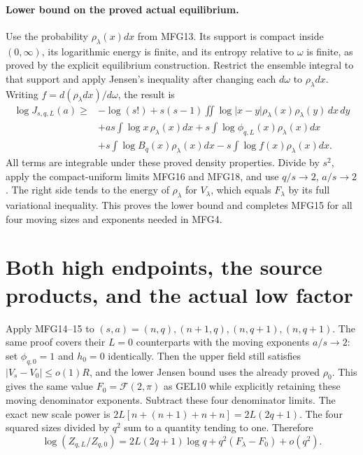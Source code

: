 \documentclass[11pt,a4paper]{article}
\begin{document}
\paragraph{Lower bound on the proved actual equilibrium.}
Use the probability $\rho_\lambda(x)dx$ from MFG13. Its support is
compact inside $(0,\infty)$, its logarithmic energy is finite, and its
entropy relative to $\omega$ is finite, as proved by the explicit
equilibrium construction. Restrict the ensemble integral to that
support and apply Jensen's inequality after changing each $d\omega$
to $\rho_\lambda dx$. Writing $f=d(\rho_\lambda dx)/d\omega$, the
result is
\[
 \begin{aligned}
 \log J_{s,q,L}(a)\ge{}&-\log(s!)
 +s(s-1)\iint\log|x-y|\rho_\lambda(x)\rho_\lambda(y)\,dx\,dy\\
 &+as\int\log x\,\rho_\lambda(x)dx
 +s\int\log\phi_{q,L}(x)\rho_\lambda(x)dx\\
 &+s\int\log B_q(x)\rho_\lambda(x)dx
 -s\int\log f(x)\rho_\lambda(x)dx.
 \end{aligned}
\]
All terms are integrable under these proved density properties.
Divide by $s^2$, apply the compact-uniform limits MFG16 and MFG18,
and use $q/s\to2$, $a/s\to2$. The right side tends to
the energy of $\rho_\lambda$ for $V_\lambda$, which equals
$F_\lambda$ by its full variational inequality. This proves the lower
bound and completes MFG15 for all four moving sizes and exponents
needed in MFG4.

\section{Both high endpoints, the source products, and the actual low factor}

Apply MFG14--15 to $(s,a)=(n,q),(n+1,q),(n,q+1),(n,q+1)$.
The same proof covers their $L=0$ counterparts with the moving
exponents $a/s\to2$: set $\phi_{q,0}=1$ and $h_0=0$ identically.
Then the upper field still satisfies $|V_s-V_0|\le o(1)R$, and
the lower Jensen bound uses the already proved $\rho_0$. This gives
the same value $F_0=\mathcal F(2,\pi)$ as GEL10 while explicitly
retaining these moving denominator exponents. Subtract these four
denominator limits. The exact new scale power
is $2L[n+(n+1)+n+n]=2L(2q+1)$. The four squared sizes divided by
$q^2$ sum to a quantity tending to one. Therefore
\[
 \boxed{\log(Z_{q,L}/Z_{q,0})
 =2L(2q+1)\log q+q^2(F_\lambda-F_0)+o(q^2).}
 \tag{MFG19}
\]
\end{document}
